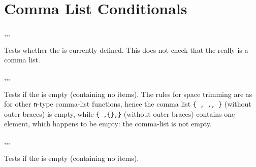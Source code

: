 \documentclass[oneside]{book}
\begin{document}
\section{Comma List Conditionals}

\begin{function}{\clistIfExist,\clistIfExistT,\clistIfExistF,\clistIfExistTF}
\begin{syntax}
 
  
  
   
\end{syntax}
Tests whether the  is currently defined.  This does
not check that the  really is a comma list.
\begin{demohigh}
\clistIfExistTF {} {}
\clistIfExistTF {} {}
\end{demohigh}
\end{function}

\begin{function}{\clistIfEmpty,\clistIfEmptyT,\clistIfEmptyF,\clistIfEmptyTF}
\begin{syntax}
 
  
  
   
\end{syntax}
Tests if the  is empty (containing no items).
The rules for space trimming are as for other \texttt{n}-type
comma-list functions, hence the comma list \verb|{ , ,, }| (without
outer braces) is empty, while \verb|{ ,{},}| (without outer braces)
contains one element, which happens to be empty: the comma-list
is not empty.
\begin{demohigh}
 {} {}
\clistIfEmptyTF { , } {} {}
\end{demohigh}
\end{function}

\begin{function}{\clistVarIfEmpty,\clistVarIfEmptyT,\clistVarIfEmptyF,\clistVarIfEmptyTF}
\begin{syntax}
 
  
  
   
\end{syntax}
Tests if the  is empty (containing no items).
\begin{demohigh}
\clistSet {}
\clistVarIfEmptyTF {} {}
\clistClear \lTmpaClist
\clistVarIfEmptyTF {} {}
\end{demohigh}
\end{function}
\end{document}
